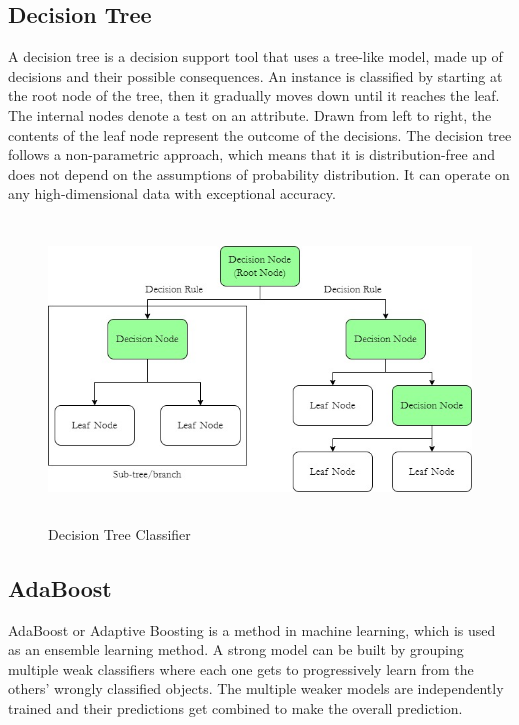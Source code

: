 \subsection{Decision Tree}
A decision tree is a decision support tool that uses a tree-like model, made up of decisions and their possible consequences. An instance is classified by starting at the root node of the tree, then it gradually moves down until it reaches the leaf. The internal nodes denote a test on an attribute. Drawn from left to right, the contents of the leaf node represent the outcome of the decisions. The decision tree follows a non-parametric approach, which means that it is distribution-free and does not depend on the assumptions of probability distribution. It can operate on any high-dimensional data with exceptional accuracy.

\begin{figure}[H]
\centering
\includegraphics[width=130mm,height=80mm]{figures/dt.jpg}
\caption{Decision Tree Classifier}
\label{DLAccuracy}
\end{figure}

\subsection{AdaBoost}
AdaBoost or Adaptive Boosting is a method in machine learning, which is used as an ensemble learning  method. A strong model can be built by grouping multiple weak classifiers where each one gets to progressively learn from the others' wrongly classified objects. The multiple weaker models are independently trained and their predictions get combined to make the overall prediction.


